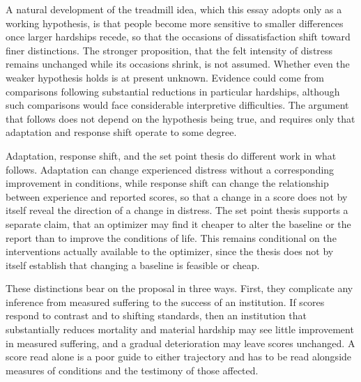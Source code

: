 \documentclass[11pt]{article}
\begin{document}
A natural development of the treadmill idea, which this essay adopts only as a working hypothesis, is that people become more sensitive to smaller differences once larger hardships recede, so that the occasions of dissatisfaction shift toward finer distinctions. The stronger proposition, that the felt intensity of distress remains unchanged while its occasions shrink, is not assumed. Whether even the weaker hypothesis holds is at present unknown. Evidence could come from comparisons following substantial reductions in particular hardships, although such comparisons would face considerable interpretive difficulties. The argument that follows does not depend on the hypothesis being true, and requires only that adaptation and response shift operate to some degree.

Adaptation, response shift, and the set point thesis do different work in what follows. Adaptation can change experienced distress without a corresponding improvement in conditions, while response shift can change the relationship between experience and reported scores, so that a change in a score does not by itself reveal the direction of a change in distress. The set point thesis supports a separate claim, that an optimizer may find it cheaper to alter the baseline or the report than to improve the conditions of life. This remains conditional on the interventions actually available to the optimizer, since the thesis does not by itself establish that changing a baseline is feasible or cheap.

These distinctions bear on the proposal in three ways. First, they complicate any inference from measured suffering to the success of an institution. If scores respond to contrast and to shifting standards, then an institution that substantially reduces mortality and material hardship may see little improvement in measured suffering, and a gradual deterioration may leave scores unchanged. A score read alone is a poor guide to either trajectory and has to be read alongside measures of conditions and the testimony of those affected.
\end{document}
